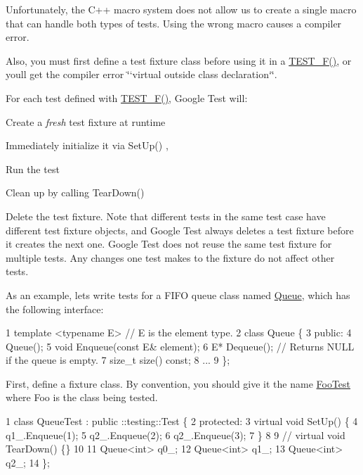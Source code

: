 Unfortunately, the C++ macro system does not allow us to create a single macro that can handle both types of tests. Using the wrong macro causes a compiler error.

Also, you must first define a test fixture class before using it in a {\ttfamily \hyperlink{gtest_8h_a0ee66d464d1a06c20c1929cae09d8758}{T\+E\+S\+T\+\_\+\+F()}}, or you\textquotesingle{}ll get the compiler error \char`\"{}`virtual outside class
declaration`\char`\"{}.

For each test defined with {\ttfamily \hyperlink{gtest_8h_a0ee66d464d1a06c20c1929cae09d8758}{T\+E\+S\+T\+\_\+\+F()}}, Google Test will\+:
\begin{DoxyEnumerate}
\item Create a {\itshape fresh} test fixture at runtime
\end{DoxyEnumerate}
\begin{DoxyEnumerate}
\item Immediately initialize it via {\ttfamily Set\+Up()} ,
\end{DoxyEnumerate}
\begin{DoxyEnumerate}
\item Run the test
\end{DoxyEnumerate}
\begin{DoxyEnumerate}
\item Clean up by calling {\ttfamily Tear\+Down()}
\end{DoxyEnumerate}
\begin{DoxyEnumerate}
\item Delete the test fixture. Note that different tests in the same test case have different test fixture objects, and Google Test always deletes a test fixture before it creates the next one. Google Test does not reuse the same test fixture for multiple tests. Any changes one test makes to the fixture do not affect other tests.
\end{DoxyEnumerate}

As an example, let\textquotesingle{}s write tests for a F\+I\+FO queue class named {\ttfamily \hyperlink{class_queue}{Queue}}, which has the following interface\+: 
\begin{DoxyCode}
1 template <typename E> // E is the element type.
2 class Queue \{
3  public:
4   Queue();
5   void Enqueue(const E& element);
6   E* Dequeue(); // Returns NULL if the queue is empty.
7   size\_t size() const;
8   ...
9 \};
\end{DoxyCode}


First, define a fixture class. By convention, you should give it the name {\ttfamily \hyperlink{class_foo_test}{Foo\+Test}} where {\ttfamily Foo} is the class being tested. 
\begin{DoxyCode}
1 class QueueTest : public ::testing::Test \{
2  protected:
3   virtual void SetUp() \{
4     q1\_.Enqueue(1);
5     q2\_.Enqueue(2);
6     q2\_.Enqueue(3);
7   \}
8 
9   // virtual void TearDown() \{\}
10 
11   Queue<int> q0\_;
12   Queue<int> q1\_;
13   Queue<int> q2\_;
14 \};
\end{DoxyCode}


